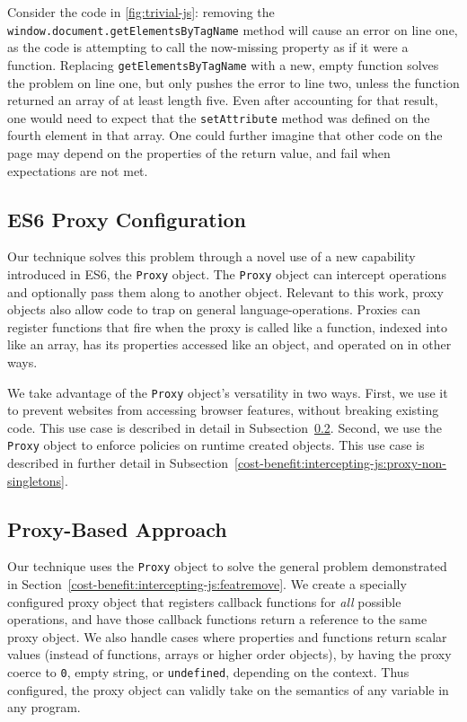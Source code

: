 

Consider the code in \ref{fig:trivial-js}:  removing the
\texttt{window.document.getElementsByTagName} method will cause an error
on line one, as the code is attempting to call the now-missing property as if
it were a function.  Replacing \texttt{getElementsByTagName} with a new, empty
function solves the problem on line one, but only pushes the error to line
two, unless the function returned an array of at least length five. Even after
accounting for that result, one would need to expect that the
\texttt{setAttribute} method was defined on the fourth element in that array.
One could further imagine that other code on the page may depend on
the properties of the return value, and fail when expectations are not
met.


\subsection{ES6 Proxy Configuration}
Our technique solves this problem through a novel use of a new capability
introduced in ES6, the \texttt{Proxy} object.  The \texttt{Proxy} object can
intercept operations and optionally pass them along to another object.
Relevant to this work, proxy objects also allow code to trap on general
language-operations.  Proxies can register functions that fire when the
proxy is called like a function, indexed into like an array, has its properties
accessed like an object, and operated on in other ways.

We take advantage of the \texttt{Proxy} object's versatility in two ways.
First, we use it to prevent websites from accessing browser features,
without breaking existing code.  This use case is described in detail in
Subsection~\ref{cost-benefit:intercepting-js:proxy-general}.  Second, we
use the \texttt{Proxy} object to enforce policies on runtime created objects.
This use case is described in further detail in
Subsection~\ref{cost-benefit:intercepting-js:proxy-non-singletons}.


\subsection{Proxy-Based Approach}
\label{cost-benefit:intercepting-js:proxy-general}
Our technique uses the \texttt{Proxy} object to solve the general problem
demonstrated in Section~\ref{cost-benefit:intercepting-js:featremove}.  We
create a specially configured proxy object that registers callback functions
for \emph{all} possible \JS operations, and have those callback functions
return a reference to the same proxy object.  We also handle cases where \WAPI
properties and functions return scalar values (instead of functions, arrays
or higher order objects), by having the proxy coerce to \texttt{0},
empty string, or \texttt{undefined}, depending on the context. Thus configured,
the proxy object can validly take on the semantics of any variable in any \JS
program.

